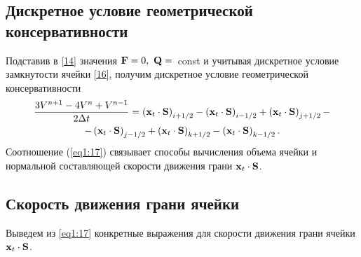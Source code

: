 \subsection{Дискретное условие геометрической консервативности}
\label{s:122}
Подставив в \eqref{14} значения ${\bf{F}} = 0,\ {\bf{Q}} =$~const и учитывая дискретное условие замкнутости 
ячейки \eqref{16}, получим дискретное условие геометрической консервативности
\begin{gather}
  \frac{{3 V^{n + 1}  - 4V^n  + V^{n - 1} }}{{2\Delta t}} = \left( {{\bf{x}}_t  \cdot {\bf{S}}} 
  \right)_{i + 1/2}  - \left( {{\bf{x}}_t  \cdot {\bf{S}}} \right)_{i - 1/2} +
  \left( {{\bf{x}}_t  \cdot {\bf{S}}} \right)_{j + 1/2}  - \notag \\ -
  \left( {{\bf{x}}_t  \cdot {\bf{S}}} \right)_{j - 1/2} + 
  \left( {{\bf{x}}_t  \cdot {\bf{S}}} \right)_{k + 1/2}  - \left( {{\bf{x}}_t  \cdot {\bf{S}}} 
  \right)_{k - 1/2}.   
  \label{eq1:17}
 \end{gather}
Соотношение (\ref{eq1:17}) связывает способы вычисления объема ячейки и 
нормальной составляющей скорости движения грани ${\bf{x}}_t \cdot {\bf{S}}$.

\subsection{Скорость движения грани ячейки}
\label{s:123}
Выведем из \eqref{eq1:17} конкретные выражения для скорости движения грани ячейки ${\bf{x}}_t \cdot {\bf{S}}$.

